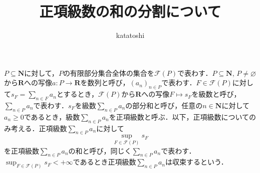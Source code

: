 \documentclass[12pt,a4paper]{jsarticle}
\newcommand{\nat}{\mathbf{N}}
\newcommand{\real}{\mathbf{R}}
\newcommand{\calF}{\mathcal{F}}
\begin{document}
\title{正項級数の和の分割について}
\author{katatoshi}
\maketitle

$P \subseteq \nat$に対して，$P$の有限部分集合全体の集合を$\calF(P)$で表わす．$P \subseteq \nat$, $P \not= \varnothing$から$\real$への写像$a\colon P \to \real$を数列と呼び，$(a_n)_{n \in P}$で表わす．$F \in \calF(P)$に対して$s_F = \sum_{n \in F} a_n$とするとき，$\calF(P)$から$\real$への写像$F \mapsto s_F$を級数と呼び，$\sum_{n \in P} a_n$で表わす．$s_F$を級数$\sum_{n \in P} a_n$の部分和と呼び，任意の$n \in \nat$に対して$a_n \geq 0$であるとき，級数$\sum_{n \in P} a_n$を正項級数と呼ぶ．以下，正項級数についてのみ考える．正項級数$\sum_{n \in P} a_n$に対して
\begin{equation*}
    \sup_{F \in \calF(P)} s_F
\end{equation*}
を正項級数$\sum_{n \in P} a_n$の和と呼び，同じく$\sum_{n \in P} a_n$で表わす．$\sup_{F \in \calF(P)} s_F < +\infty$であるとき正項級数$\sum_{n \in P} a_n$は収束するという．
\end{document}
